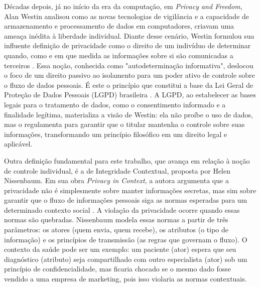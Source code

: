 Décadas depois, já no início da era da computação, em \textit{Privacy and Freedom}, Alan Westin analisou como as novas tecnologias de vigilância e a capacidade de armazenamento e processamento de dados em computadores, criavam uma ameaça inédita à liberdade individual. Diante desse cenário, Westin formulou sua influente definição de privacidade como o direito de um indivíduo de determinar quando, como e em que medida as informações sobre si são comunicadas a terceiros \cite{Westin1967}. Essa noção, conhecida como "autodeterminação informativa", deslocou o foco de um direito passivo ao isolamento para um poder ativo de controle sobre o fluxo de dados pessoais. É este o princípio que constitui a base da Lei Geral de Proteção de Dados Pessoais (LGPD) brasileira \cite{Brasil2018lgpd}. A LGPD, ao estabelecer as bases legais para o tratamento de dados, como o consentimento informado e a finalidade legítima, materializa a visão de Westin: ela não proíbe o uso de dados, mas o regulamenta para garantir que o titular mantenha o controle sobre suas informações, transformando um princípio filosófico em um direito legal e aplicável.

Outra definição fundamental para este trabalho, que avança em relação à noção de controle individual, é a de Integridade Contextual, proposta por Helen Nissenbaum. Em sua obra \textit{Privacy in Context}, a autora argumenta que a privacidade não é simplesmente sobre manter informações secretas, mas sim sobre garantir que o fluxo de informações pessoais siga as normas esperadas para um determinado contexto social \cite{Nissenbaum2009}. A violação da privacidade ocorre quando essas normas são quebradas. Nissenbaum modela essas normas a partir de três parâmetros: os atores (quem envia, quem recebe), os atributos (o tipo de informação) e os princípios de transmissão (as regras que governam o fluxo). O contexto da saúde pode ser um exemplo: um paciente (ator) espera que seu diagnóstico (atributo) seja compartilhado com outro especialista (ator) sob um princípio de confidencialidade, mas ficaria chocado se o mesmo dado fosse vendido a uma empresa de marketing, pois isso violaria as normas contextuais.


